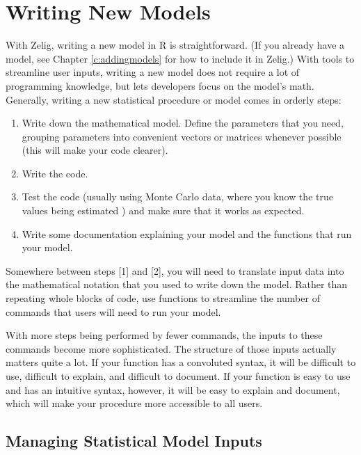 \chapter{Writing New Models} \label{s:new}

With Zelig, writing a new model in R is straightforward.  (If you
already have a model, see Chapter \ref{c:addingmodels} for how to include it in
Zelig.)  With tools to streamline user inputs, writing a new model
does not require a lot of programming knowledge, but lets developers
focus on the model's math.  Generally, writing a new statistical
procedure or model comes in orderly steps:  
\begin{enumerate}
\item Write down the mathematical model. Define the parameters that
you need, grouping parameters into convenient vectors or matrices
whenever possible (this will make your code clearer).  
\item Write the code.  
\item Test the code (usually using Monte Carlo data, where you know
the true values being estimated ) and make sure
that it works as expected. 
\item Write some documentation explaining your model and the functions
that run your model.  
\end{enumerate}
Somewhere between steps [1] and [2], you will need to translate input
data into the mathematical notation that you used to write down the
model.  Rather than repeating whole blocks of code, use functions to
streamline the number of commands that users will need to run your
model.  

With more steps being performed by fewer commands, the inputs to these
commands become more sophisticated.  The structure of those inputs
actually matters quite a lot.  If your function has a convoluted
syntax, it will be difficult to use, difficult to explain, and
difficult to document.  If your function is easy to use and has an
intuitive syntax, however, it will be easy to explain and document,
which will make your procedure more accessible to all users.

\section{Managing Statistical Model Inputs}
\label{ui}  

